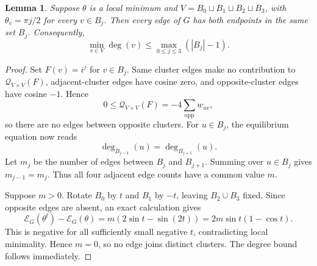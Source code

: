 \documentclass[reqno,11pt]{amsart}
\newtheorem{lemma}{Lemma}
\theoremstyle{definition}
\newcommand{\cQ}{\mathcal{Q}}
\newcommand{\abs}[1]{\left\lvert #1\right\rvert}
\newcommand{\paren}[1]{\left(#1\right)}
\begin{document}
\begin{lemma}\label{lem:exact-four-cluster-final-step}
Suppose $\theta$ is a local minimum and
$V=B_0\sqcup B_1\sqcup B_2\sqcup B_3$, with
$\theta_v=\pi j/2$ for every $v\in B_j$.  Then every edge of $G$ has both
endpoints in the same set $B_j$.  Consequently,
\[
    \min_{v \in V} \deg (v)\le\max_{0\le j\le3}\paren{\abs{B_j}-1}.
\]
\end{lemma}

\begin{proof}
Set $F(v)=i^j$ for $v\in B_j$.  Same cluster edges make no contribution
to $\cQ_{V\times V}(F)$, adjacent-cluster edges have cosine zero, and
opposite-cluster edges have cosine $-1$.  Hence
\[
    0\le\cQ_{V\times V}(F)
    =-4\sum_{\mathrm{opp}}w_{uv},
\]
so there are no edges between opposite clusters. For $u\in B_j$, the equilibrium equation now reads
\[
    \deg_{B_{j-1}}(u)=\deg_{B_{j+1}}(u).
\]
Let $m_j$ be the number of edges between $B_j$ and $B_{j+1}$.  Summing
over $u\in B_j$ gives $m_{j-1}=m_j$.  Thus all four adjacent edge counts
have a common value $m$.

Suppose $m>0$.  Rotate $B_0$ by $t$ and $B_1$ by $-t$, leaving
$B_2\cup B_3$ fixed.  Since opposite edges are absent, an exact
calculation gives
\[
    \mathcal E_G(\theta^t)-\mathcal E_G(\theta)
    =m\paren{2\sin t-\sin(2t)}
    =2m\sin t\paren{1-\cos t}.
\]
This is negative for all sufficiently small negative $t$, contradicting local
minimality.  Hence $m=0$, so no edge joins distinct clusters.  The degree
bound follows immediately.
\end{proof}
\end{document}
